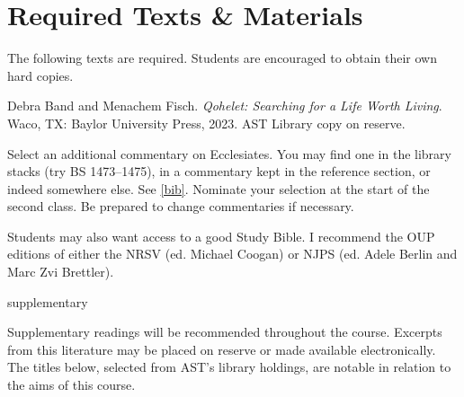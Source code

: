 \documentclass[titlepage]{article}
\newcommand\incl{../includes}
\begin{document}


%

\section{Required Texts \& Materials}
\label{texts}

The following texts are required. Students are encouraged to obtain their own hard copies.

\begingroup
\renewcommand{\section}[2]{}%
\begin{thebibliography}{Qohelet}%

	 Debra Band and Menachem Fisch.
    \emph{Qohelet: Searching for a Life Worth Living}.
    Waco, TX: Baylor University Press, 2023. AST Library copy on reserve.

	 Select an additional commentary on Ecclesiates.
	You may find one in the library stacks (try BS 1473–1475), in a
	commentary kept in the reference section, or indeed somewhere else.
	See \autoref{bib}. Nominate your selection at the start of the
	second class. Be prepared to change commentaries if necessary.

\end{thebibliography}
\endgroup

Students may also want access to a good Study Bible. I recommend the OUP
editions of either the NRSV (ed. Michael Coogan) or NJPS (ed. Adele
Berlin and Marc Zvi Brettler).

\section{Supplementary Texts}
\label{supplementary}

Supplementary readings will be recommended throughout the course.
Excerpts from this literature may be placed on reserve or made available
electronically. The titles below, selected from AST’s library holdings,
are notable in relation to the aims of this course.
\end{document}
